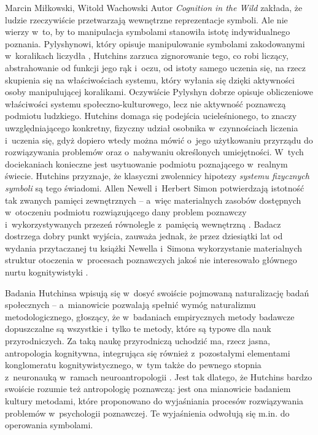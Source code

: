 \begin{artplenv2auth}{Marcin Miłkowski, Witold Wachowski}
Autor \textit{Cognition in the Wild} zakłada, że ludzie rzeczywiście przetwarzają wewnętrzne reprezentacje symboli. Ale nie wierzy w~to, by to manipulacja symbolami stanowiła istotę indywidualnego poznania. Pylyshynowi, który opisuje manipulowanie symbolami zakodowanymi w~koralikach liczydła
\parencite[][s.~56]{pylyshyn_computing_1989}, %
 Hutchins zarzuca zignorowanie tego, co robi liczący, abstrahowanie od funkcji jego rąk i~oczu, od istoty samego uczenia się, na rzecz skupienia się na właściwościach systemu, który wyłania się dzięki aktywności osoby manipulującej koralikami. Oczywiście Pylyshyn dobrze opisuje obliczeniowe właściwości systemu społeczno-kulturowego, lecz nie aktywność poznawczą podmiotu ludzkiego. Hutchins domaga się podejścia ucieleśnionego, to znaczy uwzględniającego konkretny, fizyczny udział osobnika w~czynnościach liczenia i~uczenia się, gdyż dopiero wtedy można mówić o~jego użytkowaniu przyrządu do rozwiązywania problemów oraz o~nabywaniu określonych umiejętności. W~tych dociekaniach konieczne jest usytuowanie podmiotu poznającego w~realnym świecie. Hutchins przyznaje, że klasyczni zwolennicy hipotezy \textit{systemu fizycznych symboli} są tego świadomi. Allen Newell i~Herbert Simon potwierdzają istotność tak zwanych pamięci zewnętrznych -- a~więc materialnych zasobów dostępnych w~otoczeniu podmiotu rozwiązującego dany problem poznawczy i~wykorzystywanych przezeń równolegle z~pamięcią wewnętrzną 
\parencite[][s.~800–803]{newell_human_1972}. %
 Badacz dostrzega dobry punkt wyjścia, zauważa jednak, że przez dziesiątki lat od wydania przytaczanej tu książki Newella i~Simona wykorzystanie materialnych struktur otoczenia w~procesach poznawczych jakoś nie interesowało głównego nurtu kognitywistyki 
\parencites[][]{dahlback_perspective_2016}[][s.~364–370]{hutchins_cognition_1995}.%


Badania Hutchinsa wpisują się w~dosyć swoiście pojmowaną naturalizację badań społecznych -- a~mianowicie pozwalają spełnić wymóg naturalizmu metodologicznego, głoszący, że w~badaniach empirycznych metody badawcze dopuszczalne są wszystkie i~tylko te metody, które są typowe dla nauk przyrodniczych. Za taką naukę przyrodniczą uchodzić ma, rzecz jasna, antropologia kognitywna, integrująca się również z~pozostałymi elementami konglomeratu kognitywistycznego, w~tym także do pewnego stopnia z~neuronauką w~ramach neuroantropologii
\parencite[][]{lende_encultured_2012}. %
 Jest tak dlatego, że Hutchins bardzo swoiście rozumie też antropologię poznawczą: jest ona mianowicie badaniem kultury metodami, które proponowano do wyjaśniania procesów rozwiązywania problemów w~psychologii poznawczej. Te wyjaśnienia odwołują się m.in. do operowania symbolami.


\end{artplenv2auth}
